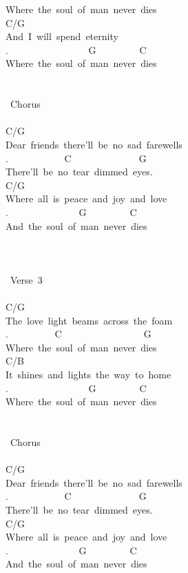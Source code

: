 {Where\ the\ soul\ of\ man\ never\ dies\\
C/G\\
And\ I\ will\ spend\ eternity\\
. \ \ \ \ \ \ \ \ \ \ \ \ \ \ \ \ G\ \ \ \ \ \ \ \ \ C\\
Where\ the\ soul\ of\ man\ never\ dies\\
\\
\\
\lbrack\ Chorus\rbrack\\
\\
C/G\\
Dear\ friends\ there'll\ be\ no\ sad\ farewells\\
. \ \ \ \ \ \ \ \ \ \ \ C\ \ \ \ \ \ \ \ \ \ \ \ \ \ G\\
There'll\ be\ no\ tear\ dimmed\ eyes.\\
C/G\\
Where\ all\ is\ peace\ and\ joy\ and\ love\\
. \ \ \ \ \ \ \ \ \ \ \ \ \ \ G\ \ \ \ \ \ \ \ \ C\\
And\ the\ soul\ of\ man\ never\ dies\\
\\
\\
\\
\lbrack\ Verse\ 3\rbrack\\
\\
C/G\\
The\ love\ light\ beams\ across\ the\ foam\\
. \ \ \ \ \ \ \ \ \ C\ \ \ \ \ \ \ \ \ \ \ \ \ \ \ \ \ G\\
Where\ the\ soul\ of\ man\ never\ dies\\
C/B\\
It\ shines\ and\ lights\ the\ way\ to\ home\\
. \ \ \ \ \ \ \ \ \ \ \ \ \ \ \ \ G\ \ \ \ \ \ \ \ \ C\\
Where\ the\ soul\ of\ man\ never\ dies\\
\\
\\
\lbrack\ Chorus\rbrack\\
\\
C/G\\
Dear\ friends\ there'll\ be\ no\ sad\ farewells\\
. \ \ \ \ \ \ \ \ \ \ \ C\ \ \ \ \ \ \ \ \ \ \ \ \ \ G\\
There'll\ be\ no\ tear\ dimmed\ eyes.\\
C/G\\
Where\ all\ is\ peace\ and\ joy\ and\ love\\
. \ \ \ \ \ \ \ \ \ \ \ \ \ \ G\ \ \ \ \ \ \ \ \ C\\
And\ the\ soul\ of\ man\ never\ dies\ }

